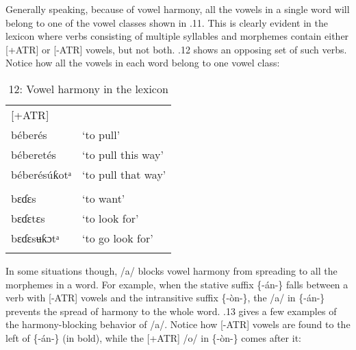 Generally speaking, because of vowel harmony, all the vowels in a single word will belong to one of the vowel classes shown in .11. This is clearly evident in the lexicon where verbs consisting of multiple syllables and morphemes contain either [+ATR] or [-ATR] vowels, but not both. .12 shows an opposing set of such verbs. Notice how all the vowels in each word belong to one vowel class:


\begin{table}
\caption{12: Vowel harmony in the lexicon}
\label{tab:2}


\begin{tabularx}{\textwidth}{XX}
\lsptoprule

[+ATR] & \\
béberés & ‘to pull’\\
béberetés & ‘to pull this way’\\
béberésúƙotᵃ & ‘to pull that way’\\
[-ATR] & \\
bɛɗɛs & ‘to want’\\
bɛɗɛtɛs & ‘to look for’\\
bɛɗɛsʉƙɔtᵃ & ‘to go look for’\\
\lspbottomrule
\end{tabularx}
\end{table}
In some situations though, /a/ blocks vowel harmony from spreading to all the morphemes in a word. For example, when the stative suffix \{-án-\} falls between a verb with [-ATR] vowels and the intransitive suffix \{-òn-\}, the /a/ in \{-án-\} prevents the spread of harmony to the whole word. .13 gives a few examples of the harmony-blocking behavior of /a/. Notice how [-ATR] vowels are found to the left of \{-án-\} (in bold), while the [+ATR] /o/ in \{-òn-\} comes after it:


